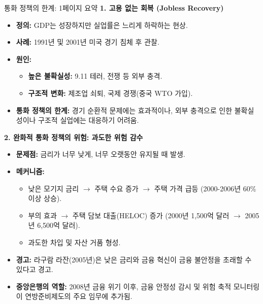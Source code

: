 \documentclass[11pt,a4paper]{article}
\begin{document}
\begin{summarybox}{통화 정책의 한계: 1페이지 요약}
\textbf{1. 고용 없는 회복 (Jobless Recovery)}
\begin{itemize}
    \item \textbf{정의:} GDP는 성장하지만 실업률은 느리게 하락하는 현상.
    \item \textbf{사례:} 1991년 및 2001년 미국 경기 침체 후 관찰.
    \item \textbf{원인:}
    \begin{itemize}
        \item \textbf{높은 불확실성:} 9.11 테러, 전쟁 등 외부 충격.
        \item \textbf{구조적 변화:} 제조업 쇠퇴, 국제 경쟁(중국 WTO 가입).
    \end{itemize}
    \item \textbf{통화 정책의 한계:} 경기 순환적 문제에는 효과적이나, 외부 충격으로 인한 불확실성이나 구조적 실업에는 대응하기 어려움.
\end{itemize}

\textbf{2. 완화적 통화 정책의 위험: 과도한 위험 감수}
\begin{itemize}
    \item \textbf{문제점:} 금리가 너무 낮게, 너무 오랫동안 유지될 때 발생.
    \item \textbf{메커니즘:}
    \begin{itemize}
        \item 낮은 모기지 금리 $\rightarrow$ 주택 수요 증가 $\rightarrow$ 주택 가격 급등 (2000-2006년 60\% 이상 상승).
        \item 부의 효과 $\rightarrow$ 주택 담보 대출(HELOC) 증가 (2000년 1,500억 달러 $\rightarrow$ 2005년 6,500억 달러).
        \item 과도한 차입 및 자산 거품 형성.
    \end{itemize}
    \item \textbf{경고:} 라구람 라잔(2005년)은 낮은 금리와 금융 혁신이 금융 불안정을 초래할 수 있다고 경고.
    \item \textbf{중앙은행의 역할:} 2008년 금융 위기 이후, 금융 안정성 감시 및 위험 축적 모니터링이 연방준비제도의 주요 임무에 추가됨.
\end{itemize}
\end{summarybox}
\end{document}
